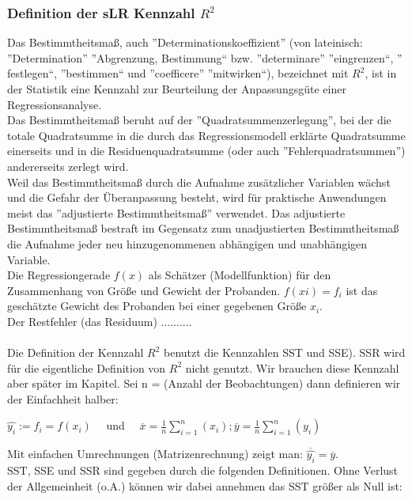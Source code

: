 \documentclass[12pt]{article}
\begin{document}
\subsubsection{Definition der sLR Kennzahl $ R^2 $}
%
Das Bestimmtheitsmaß, auch ”Determinationskoeffizient” (von lateinisch: ”Determination”
”Abgrenzung, Bestimmung“ bzw. ”determinare” ”eingrenzen“, ” festlegen“, ”bestimmen“ und ”coefficere” ”mitwirken“), bezeichnet mit $R^2$, ist in der Statistik
eine Kennzahl zur Beurteilung der Anpassungsgüte einer Regressionsanalyse.\\
Das Bestimmtheitsmaß beruht auf der ”Quadratsummenzerlegung”, bei der die totale
Quadratsumme in die durch das Regressionsmodell erklärte Quadratsumme einerseits
und in die Residuenquadratsumme (oder auch ”Fehlerquadratsummen”) andererseits
zerlegt wird.\\[0.2cm]
Weil das Bestimmtheitsmaß durch die Aufnahme zusätzlicher Variablen wächst und
die Gefahr der Überanpassung besteht, wird für praktische Anwendungen meist das
”adjustierte Bestimmtheitsmaß” verwendet. Das adjustierte Bestimmtheitsmaß bestraft
im Gegensatz zum unadjustierten Bestimmtheitsmaß die Aufnahme jeder neu
hinzugenommenen abhängigen und unabhängigen Variable.\\[0.2cm]
Die Regressiongerade $f(x)$ als Schätzer (Modellfunktion) für den Zusammenhang von
Größe und Gewicht der Probanden. $f(xi) = f_i $  ist das geschätzte Gewicht des
Probanden bei einer gegebenen Größe $x_i$.\\[0.2cm]
Der Restfehler (das Residuum) ..........\\[0.2cm]
{\color{red}{******* rest fehlt noch  *******}}\\[0.2cm]
Die Definition der Kennzahl $R^2$ benutzt die Kennzahlen SST und SSE). SSR wird für die eigentliche Definition von $R^2$ nicht genutzt. Wir brauchen diese Kennzahl aber später im Kapitel. Sei n = (Anzahl der Beobachtungen) dann definieren wir der Einfachheit halber: 
\begin{center}
$ \hat{y_i} := f_i = f(x_i)\quad $ und $ \quad \overline{x} = \frac{1}{n} \sum\limits_{i=1}^n (x_i) ; \overline{y} = \frac{1}{n} \sum\limits_{i=1}^n (y_i) $\\
\end{center} 
Mit einfachen Umrechnungen (Matrizenrechnung) zeigt man: 
$ \overline{\hat{y_i}} = \overline{y} $. \\
%
SST, SSE und SSR sind gegeben durch die folgenden Definitionen. Ohne Verlust der Allgemeinheit (o.A.) können wir dabei annehmen das SST größer als Null ist:
\end{document}
